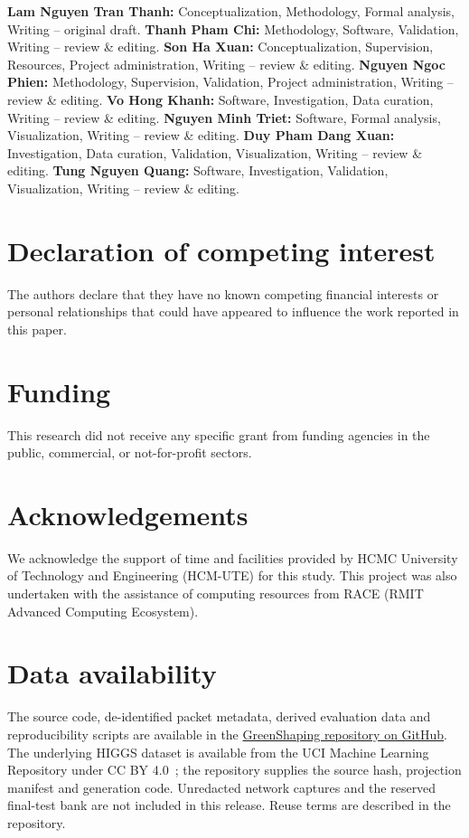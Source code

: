 \documentclass[5p,times]{elsarticle}
\begin{document}
\textbf{Lam Nguyen Tran Thanh:} Conceptualization, Methodology, Formal analysis, Writing -- original draft.
\textbf{Thanh Pham Chi:} Methodology, Software, Validation, Writing -- review \& editing.
\textbf{Son Ha Xuan:} Conceptualization, Supervision, Resources, Project administration, Writing -- review \& editing.
\textbf{Nguyen Ngoc Phien:} Methodology, Supervision, Validation, Project administration, Writing -- review \& editing.
\textbf{Vo Hong Khanh:} Software, Investigation, Data curation, Writing -- review \& editing.
\textbf{Nguyen Minh Triet:} Software, Formal analysis, Visualization, Writing -- review \& editing.
\textbf{Duy Pham Dang Xuan:} Investigation, Data curation, Validation, Visualization, Writing -- review \& editing.
\textbf{Tung Nguyen Quang:} Software, Investigation, Validation, Visualization, Writing -- review \& editing.

\section*{Declaration of competing interest}
The authors declare that they have no known competing financial interests or personal relationships that could have appeared to influence the work reported in this paper.

\section*{Funding}
This research did not receive any specific grant from funding agencies in the public, commercial, or not-for-profit sectors.

\section*{Acknowledgements}
We acknowledge the support of time and facilities provided by HCMC University of Technology and Engineering (HCM-UTE) for this study. This project was also undertaken with the assistance of computing resources from RACE (RMIT Advanced Computing Ecosystem).

\section*{Data availability}
The source code, de-identified packet metadata, derived evaluation data and reproducibility scripts are available in the \href{https://github.com/sonkhiemclaude-glitch/GreenShaping}{GreenShaping repository on GitHub}. The underlying HIGGS dataset is available from the UCI Machine Learning Repository under CC BY 4.0~\cite{whiteson2014higgs}; the repository supplies the source hash, projection manifest and generation code. Unredacted network captures and the reserved final-test bank are not included in this release. Reuse terms are described in the repository.
\end{document}
